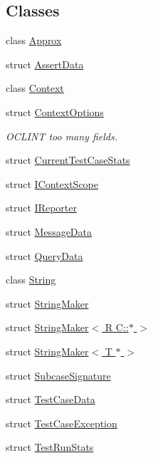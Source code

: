 \subsection*{Classes}
\begin{DoxyCompactItemize}
\item 
class \hyperlink{classdoctest_1_1Approx}{Approx}
\item 
struct \hyperlink{structdoctest_1_1AssertData}{Assert\+Data}
\item 
class \hyperlink{classdoctest_1_1Context}{Context}
\item 
struct \hyperlink{structdoctest_1_1ContextOptions}{Context\+Options}
\begin{DoxyCompactList}\small\item\em O\+C\+L\+I\+NT too many fields. \end{DoxyCompactList}\item 
struct \hyperlink{structdoctest_1_1CurrentTestCaseStats}{Current\+Test\+Case\+Stats}
\item 
struct \hyperlink{structdoctest_1_1IContextScope}{I\+Context\+Scope}
\item 
struct \hyperlink{structdoctest_1_1IReporter}{I\+Reporter}
\item 
struct \hyperlink{structdoctest_1_1MessageData}{Message\+Data}
\item 
struct \hyperlink{structdoctest_1_1QueryData}{Query\+Data}
\item 
class \hyperlink{classdoctest_1_1String}{String}
\item 
struct \hyperlink{structdoctest_1_1StringMaker}{String\+Maker}
\item 
struct \hyperlink{structdoctest_1_1StringMaker_3_01R_01C_1_1_5_01_4}{String\+Maker$<$ R C\+::$\ast$ $>$}
\item 
struct \hyperlink{structdoctest_1_1StringMaker_3_01T_01_5_01_4}{String\+Maker$<$ T $\ast$ $>$}
\item 
struct \hyperlink{structdoctest_1_1SubcaseSignature}{Subcase\+Signature}
\item 
struct \hyperlink{structdoctest_1_1TestCaseData}{Test\+Case\+Data}
\item 
struct \hyperlink{structdoctest_1_1TestCaseException}{Test\+Case\+Exception}
\item 
struct \hyperlink{structdoctest_1_1TestRunStats}{Test\+Run\+Stats}
\end{DoxyCompactItemize}
